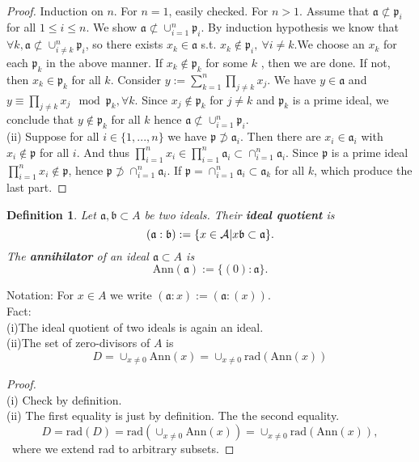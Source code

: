 \documentclass[11pt]{article}
\newtheorem{dfn}[thm]{Definition}
\newcommand{\sca}{{\mathfrak a}}
\newcommand{\scb}{{\mathfrak b}}
\newcommand{\scp}{{\mathfrak p}}
\newcommand{\cala}{{\cal A}}
\newcommand{\notsubset}{\not \subset}
\newcommand{\notsupset}{\not \supset}
\begin{document}
 
\begin{proof}
Induction on $n$. For $n=1$, easily checked. For $n > 1$. Assume that $\sca \notsubset \scp_i$ 
for all $1\leq i\leq n$. We show $\sca\notsubset \cup_{i=1}^n\scp_i$.
By induction hypothesis we know that $\forall k,\sca\notsubset \cup_{i\neq k}^n\scp_i $, so there exists $x_k\in \sca$ s.t. $x_k\notin \scp_i,\ \forall i\neq k$.We choose an $x_k$ for each $\scp_k$ in the above manner.
If $x_k\notin \scp_k$ for some $k$ , then we are done.
If not, then $x_k\in \scp_k$ for all $k$. 
Consider $y:=\sum_{k=1}^n\prod_{j\neq k}x_j$. We have $y\in \sca$ and $y \equiv \prod_{j\neq k}x_j \mod \scp_k,\forall k$.
Since $x_j\notin \scp_k$ for $j\neq k$ and $\scp_k$ is a prime ideal, we conclude that $y\notin \scp_k$ for all $k$ hence $\sca\notsubset \cup_{i=1}^n \scp_i$.\\
(ii) Suppose for all $i\in \{1,...,n\}$ we have $\scp\notsupset \sca_i$. Then there 
are $x_i\in\sca_i $ with $x_i\notin \scp$ for all $i$. 
And thus $\prod_{i=1}^n x_i\in \prod_{i=1}^n\sca_i\subset \cap_{i=1}^n\sca_i$. 
Since $\scp$ is a prime ideal $\prod_{i=1}^n x_i\notin \scp$, hence $\scp\notsupset \cap_{i=1}^n \sca_i$.
If $\scp=\cap_{i=1}^n\sca_i\subset \sca_k$ for all $k$, which produce the last part.
\end{proof}

\begin{dfn}
Let $\sca,\scb\subset A$ be two ideals. Their \textbf{ideal quotient} is 
$$
(\sca:\scb):=\{x\in \cala| x\scb \subset \sca\}.
$$ 
The \textbf{annihilator} of an ideal $\sca\subset A $ is 
$$
\text{Ann}(\sca):=\{(0):\sca\}.
$$
\end{dfn}
Notation: For $x\in A$ we write $(\sca:x):=(\sca:(x))$.\\
Fact: \\
(i)The ideal quotient of two ideals is again an ideal.\\
(ii)The set of zero-divisors  of $A$ is 
$$
D=\cup_{x\neq 0} \text{Ann}(x)=\cup_{x\neq 0}\text{rad}(\text{Ann}(x))
$$
\begin{proof}\ \\
(i) Check by definition.\\
(ii) The first equality is just by definition. The the second equality.
$$
D=\text{rad}(D)=\text{rad}(\cup_{x\neq 0}\text{Ann}(x))=\cup_{x\neq 0}\text{rad}(\text{Ann}(x)),
$$
 where we extend rad to arbitrary subsets.
\end{proof}
\end{document}
